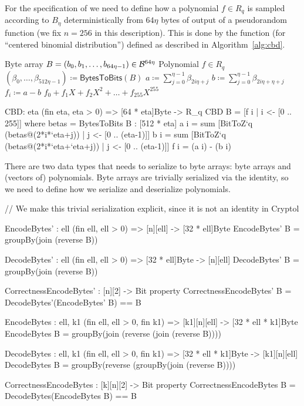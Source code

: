 For the specification of \Kyber we need to define how a polynomial $f \in R_q$ 
is sampled according to $B_\eta$ deterministically from $64\eta$ bytes of output of a
pseudorandom function (we fix $n=256$ in this description). 
This is done by the function \CBD (for ``centered binomial distribution'')
defined as described in Algorithm~\ref{alg:cbd}.

\begin{algorithm}
  \caption{$\CBD_{\eta}\colon\Bytes^{64\eta} \rightarrow R_q$
  }
  \label{alg:cbd}
  \begin{algorithmic}
    \Require Byte array $B = (b_0, b_1, \dots ,b_{64\eta-1}) \in \mathcal{B}^{64\eta}$ 
    \Ensure Polynomial $f \in R_q$
    \State $(\beta_0,\dots,\beta_{512\eta-1}) \coloneqq \mathsf{BytesToBits}(B)$
      \State $a \coloneqq \sum_{j=0}^{\eta-1}\beta_{2i\eta+j}$
      \State $b \coloneqq \sum_{j=0}^{\eta-1}\beta_{2i\eta+\eta+j}$
      \State $f_i \coloneqq a-b$
    \EndFor
    \State \Return $f_0 + f_1X + f_2X^2 + \dots + f_{255}X^{255}$
  \end{algorithmic}
\end{algorithm}

\begin{code}
  CBD: {eta} (fin eta, eta > 0) => [64 * eta]Byte -> R_q
  CBD B = [f i | i <- [0 .. 255]]
      where betas = BytesToBits B : [512 * eta]
            a i = sum [BitToZ`{q} (betas@(2*i*`eta+j)) | j <- [0 .. (eta-1)]]
            b i = sum [BitToZ`{q} (betas@(2*i*`eta+`eta+j)) | j <- [0 .. (eta-1)]]
            f i = (a i) - (b i)
\end{code}

There are two data types that \Kyber needs to serialize to byte arrays:
byte arrays and (vectors of) polynomials. Byte arrays are trivially serialized
via the identity, so we need to define how we serialize and deserialize polynomials.

\begin{code}
  // We make this trivial serialization explicit, since it is not an identity in Cryptol

  EncodeBytes' : {ell} (fin ell, ell > 0) => [n][ell] -> [32 * ell]Byte
  EncodeBytes' B = groupBy(join (reverse B))

  DecodeBytes' : {ell} (fin ell, ell > 0) => [32 * ell]Byte -> [n][ell]
  DecodeBytes' B = groupBy(join (reverse B))
  
  CorrectnessEncodeBytes' : [n][2] -> Bit
  property CorrectnessEncodeBytes' B = DecodeBytes'(EncodeBytes' B) == B
  
  EncodeBytes : {ell, k1} (fin ell, ell > 0, fin k1) =>
      [k1][n][ell] -> [32 * ell * k1]Byte
  EncodeBytes B = groupBy(join (reverse (join (reverse B))))
  
  DecodeBytes : {ell, k1} (fin ell, ell > 0, fin k1) =>
      [32 * ell * k1]Byte -> [k1][n][ell]
  DecodeBytes B = groupBy(reverse (groupBy(join (reverse B))))
  
  CorrectnessEncodeBytes : [k][n][2] -> Bit
  property CorrectnessEncodeBytes B = DecodeBytes(EncodeBytes B) == B
\end{code}

